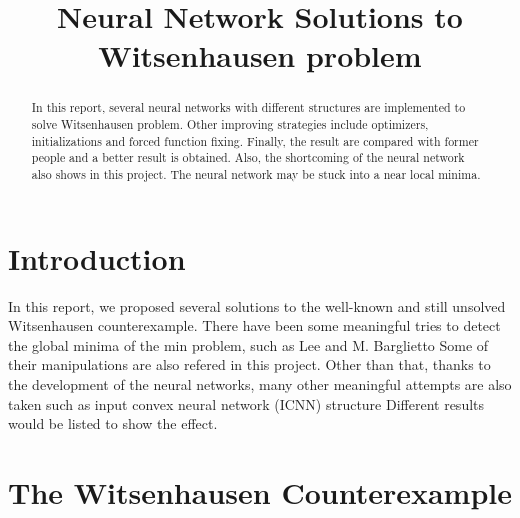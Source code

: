 \documentclass[conference,compsoc]{IEEEtran}
\begin{document}
%
\title{Neural Network Solutions to Witsenhausen problem}
\author{
}


\maketitle

\begin{abstract}
 In this report, several neural networks with different structures are implemented to solve Witsenhausen problem. Other improving strategies include optimizers, initializations and forced function fixing. Finally, the result are compared with former people and a better result is obtained. Also, the shortcoming of the neural network also shows in this project. The neural network may be stuck into a near local minima.
\end{abstract}


\section{Introduction}
  In this report, we proposed several solutions to the well-known and still unsolved Witsenhausen counterexample. \cite{witsenhausen1968counterexample} There have been some meaningful tries to detect the global minima of the min problem, such as Lee \cite{lee2001witsenhausen}and M. Barglietto \cite{baglietto2001numerical} Some of their manipulations are also refered in this project. Other than that, thanks to the development of the neural networks, many other meaningful attempts are also taken such as input convex neural network (ICNN) structure \cite{amos2017input} Different results would be listed to show the effect.

\section{The Witsenhausen Counterexample}
\end{document}
